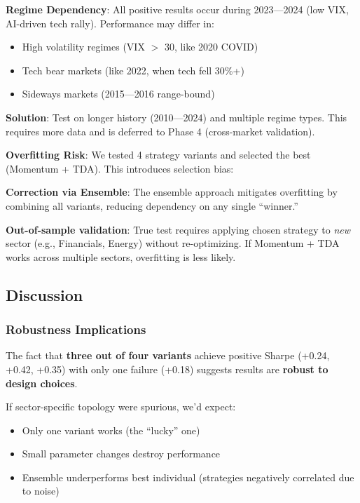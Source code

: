 \textbf{Regime Dependency}: All positive results occur during 2023---2024 (low VIX, AI-driven tech rally). Performance may differ in:
\begin{itemize}
\item High volatility regimes (VIX $>$ 30, like 2020 COVID)
\item Tech bear markets (like 2022, when tech fell 30\%+)
\item Sideways markets (2015---2016 range-bound)
\end{itemize}

\textbf{Solution}: Test on longer history (2010---2024) and multiple regime types. This requires more data and is deferred to Phase 4 (cross-market validation).

\textbf{Overfitting Risk}: We tested 4 strategy variants and selected the best (Momentum + TDA). This introduces selection bias:

\textbf{Correction via Ensemble}: The ensemble approach mitigates overfitting by combining all variants, reducing dependency on any single ``winner.''

\textbf{Out-of-sample validation}: True test requires applying chosen strategy to \textit{new} sector (e.g., Financials, Energy) without re-optimizing. If Momentum + TDA works across multiple sectors, overfitting is less likely.

\subsection{Discussion}

\subsubsection{Robustness Implications}

The fact that \textbf{three out of four variants} achieve positive Sharpe (+0.24, +0.42, +0.35) with only one failure (+0.18) suggests results are \textbf{robust to design choices}.

If sector-specific topology were spurious, we'd expect:
\begin{itemize}
\item Only one variant works (the ``lucky'' one)
\item Small parameter changes destroy performance
\item Ensemble underperforms best individual (strategies negatively correlated due to noise)
\end{itemize}

